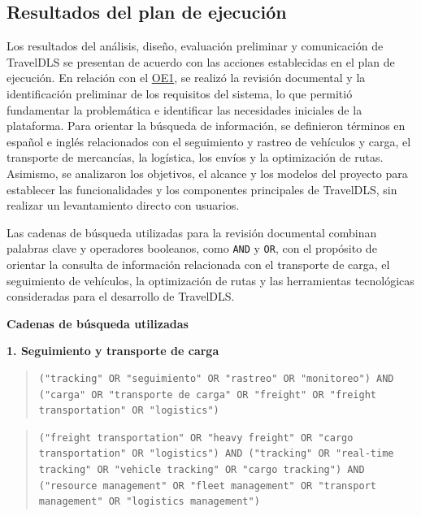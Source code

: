 \clearpage
\subsection{Resultados del plan de ejecución}
\label{sec:resultados-plan}

Los resultados del análisis, diseño, evaluación preliminar y comunicación de TravelDLS se presentan de acuerdo con las acciones establecidas en el plan de ejecución. En relación con el \hyperlink{plan-oe1}{OE1}, se realizó la revisión documental y la identificación preliminar de los requisitos del sistema, lo que permitió fundamentar la problemática e identificar las necesidades iniciales de la plataforma. Para orientar la búsqueda de información, se definieron términos en español e inglés relacionados con el seguimiento y rastreo de vehículos y carga, el transporte de mercancías, la logística, los envíos y la optimización de rutas. Asimismo, se analizaron los objetivos, el alcance y los modelos del proyecto para establecer las funcionalidades y los componentes principales de TravelDLS, sin realizar un levantamiento directo con usuarios.

Las cadenas de búsqueda utilizadas para la revisión documental combinan palabras clave y operadores booleanos, como \texttt{AND} y \texttt{OR}, con el propósito de orientar la consulta de información relacionada con el transporte de carga, el seguimiento de vehículos, la optimización de rutas y las herramientas tecnológicas consideradas para el desarrollo de TravelDLS.

\textbf{Cadenas de búsqueda utilizadas}

\textbf{1. Seguimiento y transporte de carga}

\begin{quote}
	\begin{lstlisting}[style=cadenas]
		("tracking" OR "seguimiento" OR "rastreo" OR "monitoreo") AND ("carga" OR "transporte de carga" OR "freight" OR "freight transportation" OR "logistics")
	\end{lstlisting}
\end{quote}

\begin{quote}
	\begin{lstlisting}[style=cadenas]
		("freight transportation" OR "heavy freight" OR "cargo transportation" OR "logistics") AND ("tracking" OR "real-time tracking" OR "vehicle tracking" OR "cargo tracking") AND ("resource management" OR "fleet management" OR "transport management" OR "logistics management")
	\end{lstlisting}
\end{quote}

